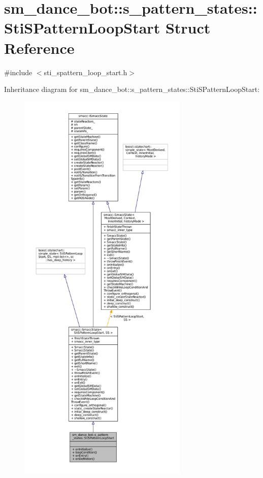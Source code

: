 \hypertarget{structsm__dance__bot_1_1s__pattern__states_1_1StiSPatternLoopStart}{}\section{sm\+\_\+dance\+\_\+bot\+:\+:s\+\_\+pattern\+\_\+states\+:\+:Sti\+S\+Pattern\+Loop\+Start Struct Reference}
\label{structsm__dance__bot_1_1s__pattern__states_1_1StiSPatternLoopStart}


{\ttfamily \#include $<$sti\+\_\+spattern\+\_\+loop\+\_\+start.\+h$>$}



Inheritance diagram for sm\+\_\+dance\+\_\+bot\+:\+:s\+\_\+pattern\+\_\+states\+:\+:Sti\+S\+Pattern\+Loop\+Start\+:
\nopagebreak
\begin{figure}[H]
\begin{center}
\leavevmode
\includegraphics[height=550pt]{structsm__dance__bot_1_1s__pattern__states_1_1StiSPatternLoopStart__inherit__graph}
\end{center}
\end{figure}


